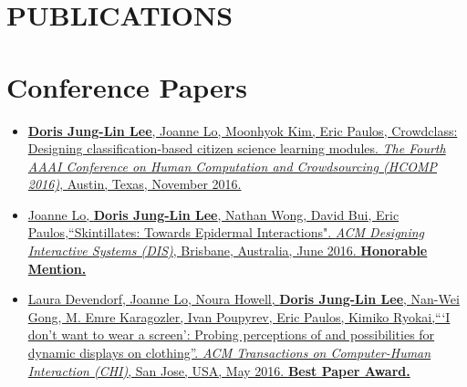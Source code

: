 \documentclass{res}
\begin{document}
\begin{resume}
\section{PUBLICATIONS}
\vspace{-2pt}
\section{Conference Papers}
\begin{itemize}
\item \href{http://aaai.org/ocs/index.php/HCOMP/HCOMP16/paper/viewFile/14027/13638}{\textbf{Doris Jung-Lin Lee}, Joanne Lo, Moonhyok Kim, Eric Paulos, Crowdclass: Designing classification-based citizen science learning modules. \textit{The Fourth AAAI Conference on Human Computation and Crowdsourcing (HCOMP 2016)}, Austin, Texas, November 2016.}
\item \href{http://dl.acm.org/citation.cfm?id=2901885&CFID=765226474&CFTOKEN=46922780}{Joanne Lo, \textbf{Doris Jung-Lin Lee}, Nathan Wong, David Bui, Eric Paulos,``Skintillates: Towards Epidermal Interactions".  \textit{ACM Designing Interactive Systems (DIS)}, Brisbane, Australia, June 2016. \textbf{Honorable Mention.}}
\item \href{http://dl.acm.org/citation.cfm?id=2858192&CFID=765226474&CFTOKEN=46922780}{Laura Devendorf, Joanne Lo, Noura Howell, \textbf{Doris Jung-Lin Lee}, Nan-Wei Gong, M. Emre Karagozler, Ivan  Poupyrev, Eric Paulos, Kimiko Ryokai,``\hspace{1pt}`I don't want to wear a screen': Probing perceptions of and  possibilities for dynamic displays on clothing''. \textit{ACM Transactions on Computer-Human Interaction (CHI)}, San Jose, USA, May 2016. \textbf{Best Paper Award.}}
\end{itemize}
\vspace{-10pt}

\end{resume}
\end{document}
